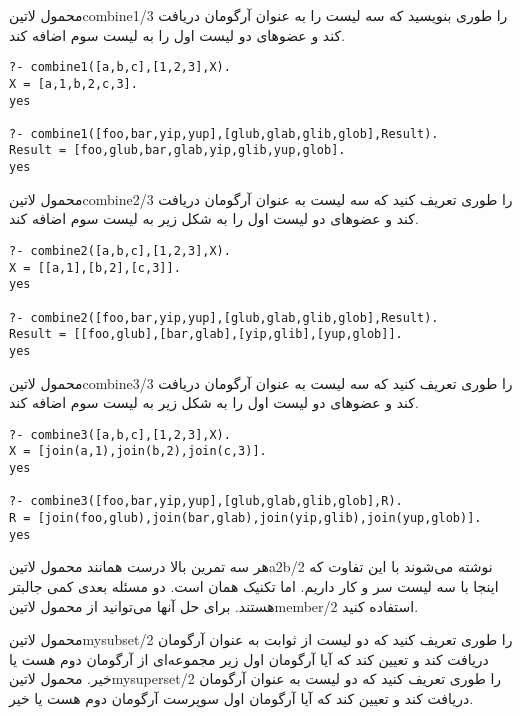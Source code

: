 \begin{enumerate}
 محمول ‌لاتین{combine1/3} را طوری بنویسید که سه لیست را به عنوان آرگومان دریافت کند و عضوهای دو لیست اول را به لیست سوم اضافه کند.
\begin{latin}
\begin{lstlisting}
?- combine1([a,b,c],[1,2,3],X).
X = [a,1,b,2,c,3].
yes

?- combine1([foo,bar,yip,yup],[glub,glab,glib,glob],Result).
Result = [foo,glub,bar,glab,yip,glib,yup,glob].
yes
\end{lstlisting}
\end{latin}

 محمول ‌لاتین{combine2/3} را طوری تعریف کنید که سه لیست به عنوان آرگومان دریافت کند و عضوهای دو لیست اول را به شکل زیر به لیست سوم اضافه کند.
\begin{latin}
\begin{lstlisting}
?- combine2([a,b,c],[1,2,3],X).
X = [[a,1],[b,2],[c,3]].
yes

?- combine2([foo,bar,yip,yup],[glub,glab,glib,glob],Result).
Result = [[foo,glub],[bar,glab],[yip,glib],[yup,glob]].
yes
\end{lstlisting}
\end{latin}

 محمول ‌لاتین{combine3/3} را طوری تعریف کنید که سه لیست به عنوان آرگومان دریافت کند و عضوهای دو لیست اول را به شکل زیر به لیست سوم اضافه کند.
\begin{latin}
\begin{lstlisting}
?- combine3([a,b,c],[1,2,3],X).
X = [join(a,1),join(b,2),join(c,3)].
yes

?- combine3([foo,bar,yip,yup],[glub,glab,glib,glob],R).
R = [join(foo,glub),join(bar,glab),join(yip,glib),join(yup,glob)].
yes
\end{lstlisting}
\end{latin}

\end{enumerate}

هر سه تمرین بالا درست همانند محمول ‌لاتین{a2b/2} نوشته می‌شوند با این تفاوت که اینجا با سه لیست سر و کار داریم. اما تکنیک همان است. دو مسئله بعدی کمی جالبتر هستند. برای حل آنها می‌توانید از محمول ‌لاتین{member/2} استفاده کنید.

\begin{enumerate}
 محمول ‌لاتین{mysubset/2} را طوری تعریف کنید که دو لیست از ثوابت به عنوان آرگومان دریافت کند و تعیین کند که آیا آرگومان اول زیر مجموعه‌ای از آرگومان دوم هست یا خیر.
 محمول ‌لاتین{mysuperset/2} را طوری تعریف کنید که دو لیست به عنوان آرگومان دریافت کند و تعیین کند که آیا آرگومان اول سوپرست آرگومان دوم هست یا خیر.
\end{enumerate}
